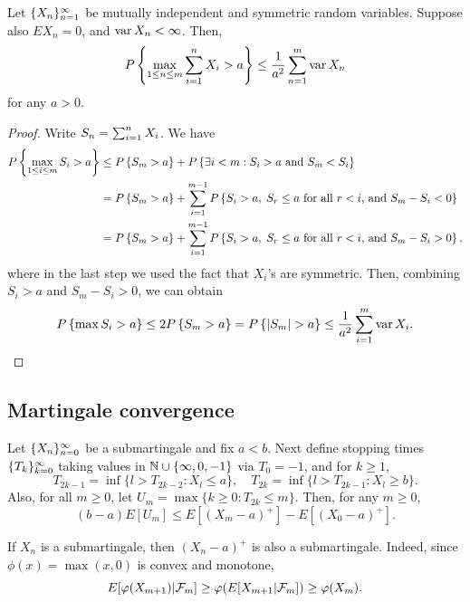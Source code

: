 \documentclass[a4paper]{article}
\begin{document}
\begin{thm}
  Let $\{ X_n \}_{n=1}^\infty$ be mutually independent and symmetric random 
  variables. Suppose also $E X_n = 0$, 
  and $\operatorname{var} X_n < \infty$. Then, 
  \[
  P \left\{ \max_{1 \leq n \leq m} \sum_{i=1}^n X_i > a \right\}
  \leq \frac{1}{a^2} \sum_{n=1}^m \operatorname{var} X_n
  \]
  for any $a > 0$.
\end{thm}

\begin{proof}
  Write $S_n = \sum_{i=1}^n X_i$. We have 
  \begin{align*}
    P \left\{ \max_{1 \leq i \leq m} S_i > a \right\} 
    &\leq P \left\{ S_m > a \right\}
    + P \left\{ \exists i < m : S_i > a \text{ and } S_m < S_i \right\} \\
    &= P \left\{ S_m > a \right\} 
    + \sum_{i=1}^{m - 1} P \left\{ S_i > a, \; S_r \leq a
    \text{ for all $r < i$, and } S_m - S_i < 0 \right\} \\
    &= P \left\{ S_m > a \right\} 
    + \sum_{i=1}^{m - 1} P \left\{ S_i > a, \; S_r \leq a
    \text{ for all $r < i$, and } S_m - S_i > 0 \right\},
  \end{align*}
  where in the last step we used the fact that $X_i$'s are symmetric.
  Then, combining $S_i > a$ and $S_m - S_i > 0$, we can obtain 
  \[
  P \left\{ \max S_i > a \right\} 
  \leq 2 P \left\{ S_m > a \right\} 
  = P \left\{ \left\lvert S_m\right\rvert > a \right\}
  \leq \frac{1}{a^2} \sum_{i=1}^m \operatorname{var} X_i.
  \]

\end{proof}

\subsection{Martingale convergence}

\begin{thm}
  Let $\{ X_n \}_{n=0}^\infty$ be a submartingale and fix $a < b$.
  Next define stopping times $\{ T_k \}_{k=0}^\infty$ taking values
  in $\mathbb{N} \cup \{\infty, 0, -1\}$ via $T_0 = -1$, and for 
  $k \geq 1$,
  \[
  T_{2k - 1} = \inf \{l > T_{2k-2} : X_l \leq a\}, \quad 
  T_{2k} = \inf \{l > T_{2k-1}: X_l \geq b\}.
  \]
  Also, for all $m \geq 0$, let $U_m = \max \{k \geq 0:  T_{2k} \leq m \}$.
  Then, for any $m \geq 0$,
  \[
  (b - a) E [U_m] \leq E [(X_m - a)^+] - E [(X_0 - a)^+].
  \]
\end{thm}

\begin{remark}
  If $X_n$ is a submartingale, then $(X_n - a)^+$ is also a 
  submartingale. Indeed, since $\phi(x) = \max(x, 0)$ is convex and 
  monotone,
  \[
  E [\varphi(X_{m + 1}) | \mathcal{F}_m] \geq \varphi (E [X_{m + 1} | \mathcal{F}_m])
  \geq \varphi(X_m).
  \]
\end{remark}
\end{document}
